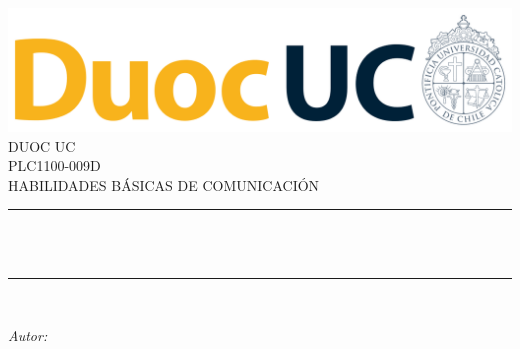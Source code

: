 
\begin{titlepage}
	\centering
    \vspace*{0.0 cm}
    \includegraphics[scale = 1]{imagenes/Logo_DuocUC.png}\\[1.0 cm]	%
    \textsc{\LARGE DUOC UC}\\[2.0 cm]	%
	\textsc{\Large PLC1100-009D}\\[0.5 cm]				%
	\textsc{\large HABILIDADES BÁSICAS DE COMUNICACIÓN}\\[0.5 cm]		%
	\rule{\linewidth}{0.2 mm} \\[0.4 cm]
	{ \huge \bfseries \eltitulo}\\
	\rule{\linewidth}{0.2 mm} \\[1.5 cm]
	
	\begin{minipage}{0.4\textwidth}
		\begin{center} \large
			\emph{Autor:}\\
			\elautor\linebreak
			\end{center}
	\end{minipage}\\[2 cm]
	
	{\large \lafecha}\\[2 cm]
 
	\vfill
	
\end{titlepage}